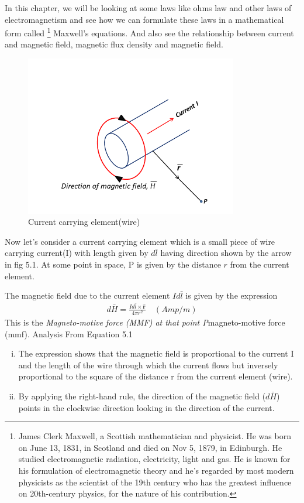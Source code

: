 In this chapter, we will be looking at some laws like ohms law and other laws of electromagnetism and see how we can formulate these laws in a mathematical form called \footnote{
James Clerk Maxwell, a Scottish mathematician and physicist. He was born on June 13, 1831, in Scotland and died on Nov 5, 1879, in Edinburgh. He studied electromagnetic radiation, electricity, light and gas. He is known for his formulation of electromagnetic theory and he's regarded by most modern physicists as the scientist of the 19th century who has the greatest influence on 20th-century physics, for the nature of his contribution.
} Maxwell's equations. And also see the relationship between current and magnetic field, magnetic flux density and magnetic field.
\begin{figure}[h]
\centering
\includegraphics[height=7cm]{graphics/currentElement}
\caption{Current carrying element(wire)}
\label{fig 5.1:currentelement}
\end{figure}

Now let's consider a current carrying element which is a small piece of wire carrying current(I) with length given by $d\bar{l}$ having direction shown by the arrow in fig 5.1. At some point in space, P is given by the distance $r$ from the current element.

The magnetic field due to the current element $Id\bar{l}$ is given by the expression
\begin{align}
\boxed{d\bar{H}= \frac{Id\bar{l} \times \hat{\textbf{r}}}{4\pi r^{2}}}\quad (Amp/m)
\end{align} 
This is the \emph{Magneto-motive force (MMF) at that point P}magneto-motive force (mmf). Analysis From Equation 5.1
\begin{enumerate}[(i)]
\item The expression shows that the magnetic field is proportional to the current I and the length of the wire through which the current flows but inversely proportional to the square of the distance r from the current element (wire).
\item By applying the right-hand rule, the direction of the magnetic field ($d\bar{H}$) points in the clockwise direction looking in the direction of the current.
\end{enumerate}

